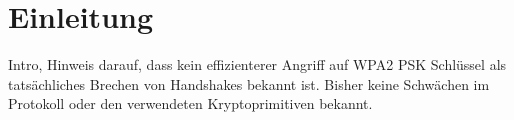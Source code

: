 \section{Einleitung}
Intro, Hinweis darauf, dass kein effizienterer Angriff auf WPA2 PSK Schlüssel als tatsächliches Brechen von Handshakes bekannt ist. Bisher keine Schwächen im Protokoll oder den verwendeten Kryptoprimitiven bekannt.